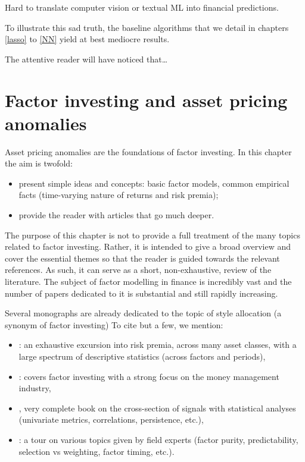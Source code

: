 \documentclass[]{krantz}
\providecommand{\tightlist}{%
  \setlength{\itemsep}{0pt}\setlength{\parskip}{0pt}}
\theoremstyle{definition}
\theoremstyle{definition}
\theoremstyle{definition}
\theoremstyle{remark}
\begin{document}
Hard to translate computer vision or textual ML into financial
predictions.

To illustrate this sad truth, the baseline algorithms that we detail in
chapters \ref{lasso} to \ref{NN} yield at best mediocre results.

The attentive reader will have noticed that\ldots{}

\hypertarget{factor}{%
\chapter{Factor investing and asset pricing anomalies}\label{factor}}

Asset pricing anomalies are the foundations of factor investing. In this
chapter the aim is twofold:

\begin{itemize}
\tightlist
\item
  present simple ideas and concepts: basic factor models, common
  empirical facts (time-varying nature of returns and risk premia);\\
\item
  provide the reader with articles that go much deeper.
\end{itemize}

The purpose of this chapter is not to provide a full treatment of the
many topics related to factor investing. Rather, it is intended to give
a broad overview and cover the essential themes so that the reader is
guided towards the relevant references. As such, it can serve as a
short, non-exhaustive, review of the literature. The subject of factor
modelling in finance is incredibly vast and the number of papers
dedicated to it is substantial and still rapidly increasing.

Several monographs are already dedicated to the topic of style
allocation (a synonym of factor investing) To cite but a few, we
mention:

\begin{itemize}
\tightlist
\item
  \citet{ilmanen2011expected}: an exhaustive excursion into risk premia,
  across many asset classes, with a large spectrum of descriptive
  statistics (across factors and periods),\\
\item
  \citet{ang2014asset}: covers factor investing with a strong focus on
  the money management industry,\\
\item
  \citet{bali2016empirical}, very complete book on the cross-section of
  signals with statistical analyses (univariate metrics, correlations,
  persistence, etc.),\\
\item
  \citet{jurczenko2017factor}: a tour on various topics given by field
  experts (factor purity, predictability, selection vs weighting, factor
  timing, etc.).
\end{itemize}
\end{document}
